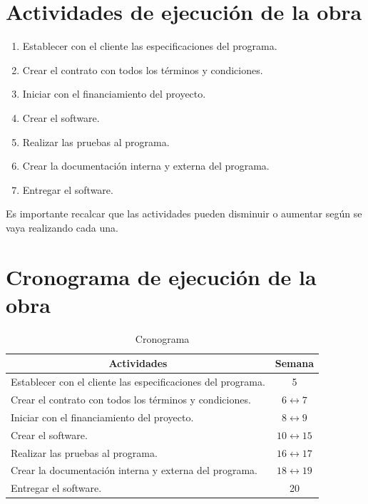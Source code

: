 \documentclass[conference]{IEEEtran}
\begin{document}
\section{Actividades de ejecución de la obra}

\begin{enumerate}

\item Establecer con el cliente las especificaciones del programa.
\item Crear el contrato con todos los términos y condiciones.
\item Iniciar con el financiamiento del proyecto.
\item Crear el software.
\item Realizar las pruebas al programa.
\item Crear la documentación interna y externa del programa.
\item Entregar el software.
\end{enumerate}

Es importante recalcar que las actividades pueden disminuir o aumentar según se vaya realizando cada una.
\section{Cronograma de ejecución de la obra}

\begin{table}[H]
  \centering
  \caption{Cronograma}
    \begin{tabular}{|l|c|}
    \toprule
    \multicolumn{1}{|c|}{\textbf{Actividades}} & \textbf{Semana} \\
    \midrule
    \multicolumn{1}{|l|}{\multirow{3}[2]{*}{Establecer con el cliente las especificaciones del programa.}} & \multirow{3}[2]{*}{5} \\
          &  \\
          &  \\
    \midrule
    \multirow{2}[2]{*}{Crear el contrato con todos los términos y condiciones.} & \multirow{2}[2]{*}{$6\leftrightarrow7$} \\
          &  \\
    \midrule
    \multirow{2}[2]{*}{Iniciar con el financiamiento del proyecto.} & \multirow{2}[2]{*}{$8\leftrightarrow9$} \\
          &  \\
    \midrule
    \multirow{2}[2]{*}{Crear el software.} & \multirow{2}[2]{*}{$10\leftrightarrow15$} \\
          &  \\
    \midrule
    \multirow{2}[2]{*}{Realizar las pruebas al programa.} & \multirow{2}[2]{*}{$16\leftrightarrow17$} \\
          &  \\
    \midrule
    \multirow{2}[2]{*}{Crear la documentación interna y externa del programa.} & \multirow{2}[2]{*}{$18\leftrightarrow19$} \\
          &  \\
    \midrule
    Entregar el software. & 20 \\
    \bottomrule
    \end{tabular}%
  \label{tab:addlabel}%
\end{table}%
\end{document}
